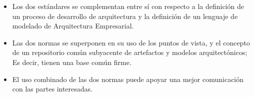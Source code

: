 \begin{itemize}
	\item Los dos estándares se complementan entre sí con respecto a la definición de un proceso de desarrollo de arquitectura y la definición de un lenguaje de modelado de Arquitectura Empresarial.
	\item Las dos normas se superponen en su uso de los puntos de vista, y el concepto de un repositorio común subyacente de artefactos y modelos arquitectónicos; Es decir, tienen una base común firme.
	\item El uso combinado de las dos normas puede apoyar una mejor comunicación con las partes interesadas.
\end{itemize}


\newpage


